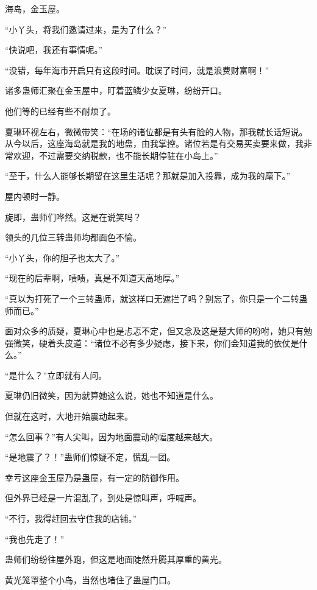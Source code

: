 
\begin{this_body}

海岛，金玉屋。

“小丫头，将我们邀请过来，是为了什么？”

“快说吧，我还有事情呢。”

“没错，每年海市开启只有这段时间。耽误了时间，就是浪费财富啊！”

诸多蛊师汇聚在金玉屋中，盯着蓝鳞少女夏琳，纷纷开口。

他们等的已经有些不耐烦了。

夏琳环视左右，微微带笑：“在场的诸位都是有头有脸的人物，那我就长话短说。从今以后，这座海岛就是我的地盘，由我掌控。诸位若是有交易买卖要来做，我非常欢迎，不过需要交纳税款，也不能长期停驻在小岛上。”

“至于，什么人能够长期留在这里生活呢？那就是加入投靠，成为我的麾下。”

屋内顿时一静。

旋即，蛊师们哗然。这是在说笑吗？

领头的几位三转蛊师均都面色不愉。

“小丫头，你的胆子也太大了。”

“现在的后辈啊，啧啧，真是不知道天高地厚。”

“真以为打死了一个三转蛊师，就这样口无遮拦了吗？别忘了，你只是一个二转蛊师而已。”

面对众多的质疑，夏琳心中也是忐忑不定，但又念及这是楚大师的吩咐，她只有勉强微笑，硬着头皮道：“诸位不必有多少疑虑，接下来，你们会知道我的依仗是什么。”

“是什么？”立即就有人问。

夏琳仍旧微笑，因为就算她这么说，她也不知道是什么。

但就在这时，大地开始震动起来。

“怎么回事？”有人尖叫，因为地面震动的幅度越来越大。

“是地震了？！”蛊师们惊疑不定，慌乱一团。

幸亏这座金玉屋乃是蛊屋，有一定的防御作用。

但外界已经是一片混乱了，到处是惊叫声，呼喊声。

“不行，我得赶回去守住我的店铺。”

“我也先走了！”

蛊师们纷纷往屋外跑，但这是地面陡然升腾其厚重的黄光。

黄光笼罩整个小岛，当然也堵住了蛊屋门口。


\end{this_body}
